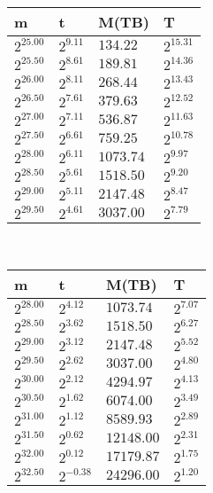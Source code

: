 \begin{tabular}{llll}
m & t & M(TB) & T \\ \hline
$2^{25.00}$ & $2^{9.11}$ & $134.22$ & $2^{15.31}$ \\
$2^{25.50}$ & $2^{8.61}$ & $189.81$ & $2^{14.36}$ \\
$2^{26.00}$ & $2^{8.11}$ & $268.44$ & $2^{13.43}$ \\
$2^{26.50}$ & $2^{7.61}$ & $379.63$ & $2^{12.52}$ \\
$2^{27.00}$ & $2^{7.11}$ & $536.87$ & $2^{11.63}$ \\
$2^{27.50}$ & $2^{6.61}$ & $759.25$ & $2^{10.78}$ \\
$2^{28.00}$ & $2^{6.11}$ & $1073.74$ & $2^{9.97}$ \\
$2^{28.50}$ & $2^{5.61}$ & $1518.50$ & $2^{9.20}$ \\
$2^{29.00}$ & $2^{5.11}$ & $2147.48$ & $2^{8.47}$ \\
$2^{29.50}$ & $2^{4.61}$ & $3037.00$ & $2^{7.79}$ \\
\end{tabular}
 \ 
\begin{tabular}{llll}
m & t & M(TB) & T \\ \hline
$2^{28.00}$ & $2^{4.12}$ & $1073.74$ & $2^{7.07}$ \\
$2^{28.50}$ & $2^{3.62}$ & $1518.50$ & $2^{6.27}$ \\
$2^{29.00}$ & $2^{3.12}$ & $2147.48$ & $2^{5.52}$ \\
$2^{29.50}$ & $2^{2.62}$ & $3037.00$ & $2^{4.80}$ \\
$2^{30.00}$ & $2^{2.12}$ & $4294.97$ & $2^{4.13}$ \\
$2^{30.50}$ & $2^{1.62}$ & $6074.00$ & $2^{3.49}$ \\
$2^{31.00}$ & $2^{1.12}$ & $8589.93$ & $2^{2.89}$ \\
$2^{31.50}$ & $2^{0.62}$ & $12148.00$ & $2^{2.31}$ \\
$2^{32.00}$ & $2^{0.12}$ & $17179.87$ & $2^{1.75}$ \\
$2^{32.50}$ & $2^{-0.38}$ & $24296.00$ & $2^{1.20}$ \\
\end{tabular}
 \ 
